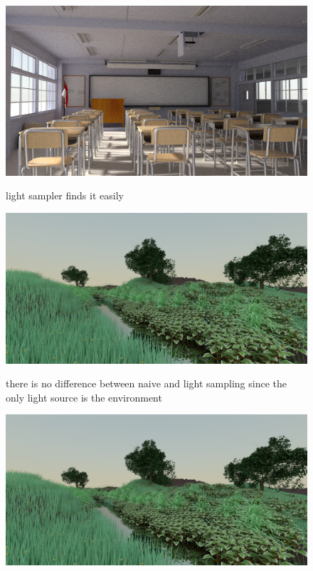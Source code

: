 \documentclass[12pt]{report}
\begin{document}
    \begin{figure}[h]
        \caption{light sampler finds it easily}
        \includegraphics[width=\textwidth]{classroom_path}
        \centering
        \label{fig:classroom_path}
    \end{figure}

    \begin{figure}[h]
        \caption{there is no difference between naive and light sampling since the only light source is the environment}
        \includegraphics[width=\textwidth]{ecosys_naive}
        \centering
        \label{fig:ecosys_naive}
    \end{figure}

    \begin{figure}[h]
        \includegraphics[width=\textwidth]{ecosys_path}
        \centering
        \label{fig:ecosys_path}
    \end{figure}
\end{document}
